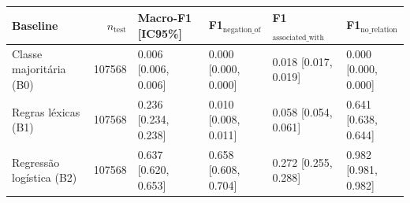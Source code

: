 \begin{tabular}{lrllll}
\toprule
Baseline & $n_{\text{test}}$ & Macro-F1 [IC95\%] & F1$_{\text{negation\_of}}$ & F1$_{\text{associated\_with}}$ & F1$_{\text{no\_relation}}$ \\
\midrule
Classe majoritária (B0) & 107568 & 0.006 [0.006, 0.006] & 0.000 [0.000, 0.000] & 0.018 [0.017, 0.019] & 0.000 [0.000, 0.000] \\
Regras léxicas (B1) & 107568 & 0.236 [0.234, 0.238] & 0.010 [0.008, 0.011] & 0.058 [0.054, 0.061] & 0.641 [0.638, 0.644] \\
Regressão logística (B2) & 107568 & 0.637 [0.620, 0.653] & 0.658 [0.608, 0.704] & 0.272 [0.255, 0.288] & 0.982 [0.981, 0.982] \\
\bottomrule
\end{tabular}
